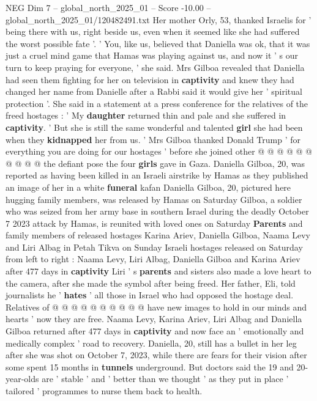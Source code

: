 \begin{textsample}{NEG Dim 7 – global\_north\_2025\_01 – Score -10.00 – global\_north\_2025\_01/120482491.txt}  \label{ex:f7_neg_057}
Her mother Orly, 53, thanked Israelis for ' being there with us, right beside us, even when it seemed like she had suffered the worst possible fate '. ' You, like us, believed that Daniella was ok, that it was just a cruel mind game that Hamas was playing against us, and now it ' s our turn to keep praying for everyone, ' she said.
Mrs Gilboa revealed that Daniella had seen them fighting for her on television in \textbf{captivity} and knew they had changed her name from Danielle after a Rabbi said it would give her ' spiritual protection '.
She said in a statement at a press conference for the relatives of the freed hostages : ' My \textbf{daughter} returned thin and pale and she suffered in \textbf{captivity}. ' But she is still the same wonderful and talented \textbf{girl} she had been when they \textbf{kidnapped} her from us. ' Mrs Gilboa thanked Donald Trump ' for everything you are doing for our hostages ' before she joined other @ @ @ @ @ @ @ @ @ @ the defiant pose the four \textbf{girls} gave in Gaza.
Daniella Gilboa, 20, was reported as having been killed in an Israeli airstrike by Hamas as they published an image of her in a white \textbf{funeral} kafan Daniella Gilboa, 20, pictured here hugging family members, was released by Hamas on Saturday Gilboa, a soldier who was seized from her army base in southern Israel during the deadly October 7 2023 attack by Hamas, is reunited with loved ones on Saturday \textbf{Parents} and family members of released hostages Karina Ariev, Daniella Gilboa, Naama Levy and Liri Albag in Petah Tikva on Sunday Israeli hostages released on Saturday from left to right : Naama Levy, Liri Albag, Daniella Gilboa and Karina Ariev after 477 days in \textbf{captivity} Liri ' s \textbf{parents} and sisters also made a love heart to the camera, after she made the symbol after being freed.
Her father, Eli, told journalists he ' \textbf{hates} ' all those in Israel who had opposed the hostage deal.
Relatives of @ @ @ @ @ @ @ @ @ @ have new images to hold in our minds and hearts ' now they are free.
Naama Levy, Karina Ariev, Liri Albag and Daniella Gilboa returned after 477 days in \textbf{captivity} and now face an ' emotionally and medically complex ' road to recovery.
Daniella, 20, still has a bullet in her leg after she was shot on October 7, 2023, while there are fears for their vision after some spent 15 months in \textbf{tunnels} underground.
But doctors said the 19 and 20-year-olds are ' stable ' and ' better than we thought ' as they put in place ' tailored ' programmes to nurse them back to health.

\end{textsample}
